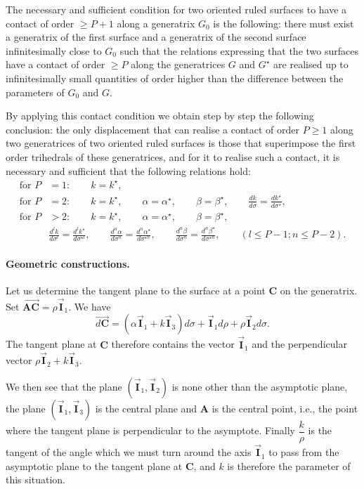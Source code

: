 \documentclass[leqno,11pt]{book}
\numberwithin{equation}{chapter}
\theoremstyle{shape1}
\theoremstyle{shapesmall}
\newcommand{\str}{^{\star}}
\newcommand{\rvec}[1]{\vec{\mathbf{#1}}}
\newcommand{\ivec}{\rvec{I}}
\begin{document}
The necessary and sufficient condition for two oriented ruled surfaces to have a contact of order $\ge P+1$ along a generatrix $G_{0}$ is the following: there must exist a generatrix of the first surface and a generatrix of the second surface infinitesimally close to $G_{0}$ such that the relations expressing that the two surfaces have a contact of order $\ge P$ along the generatrices $G$ and $G\str$ are realised up to infinitesimally small quantities of order higher than the difference between the parameters of $G_{0}$ and $G$.

By applying this contact condition we obtain step by step the following conclusion: the only displacement that can realise a contact of order $P\ge 1$ along two generatrices of two oriented ruled surfaces is those that superimpose the first order trihedrals of these generatrices, and for it to realise such a contact, it is necessary and sufficient that the following relations hold:
\begin{align*}
  \text{for }P&=1:\qquad k=k\str,\\
  \text{for }P&=2:\qquad k=k\str,\qquad\alpha=\alpha\str,\qquad\beta=\beta\str,\qquad\frac{dk}{d\sigma}=\frac{dk\str}{d\sigma\str},\\
  \text{for }P&>2:\qquad k=k\str,\qquad\alpha=\alpha\str,\qquad\beta=\beta\str,\\
&\frac{d^{l}k}{d\sigma^{l}}=\frac{d^{l}k\str}{d\sigma^{\star l}},\qquad
\frac{d^{n}\alpha}{d\sigma^{n}}=\frac{d^{n}\alpha\str}{d\sigma^{\star n}},\qquad
\frac{d^{n}\beta}{d\sigma^{n}}=\frac{d^{n}\beta\str}{d\sigma^{\star n}},\qquad
(l\le P-1;n\le P-2).
\end{align*}


\paragraph{Geometric constructions.}
\label{sec:48}
Let us determine the tangent plane to the surface at a point $\mathbf{C}$ on the generatrix. Set $\overrightarrow{\mathbf{AC}}=\rho\ivec_{1}$. We have
\[
\overrightarrow{d\mathbf{C}}=(\alpha\ivec_{1}+k\ivec_{3})d\sigma+\ivec_{1}d\rho+\rho\ivec_{2}d\sigma.
\]
The tangent plane at $\mathbf{C}$ therefore contains the vector $\ivec_{1}$ and the perpendicular vector $\rho\ivec_{2}+k\ivec_{3}$.

We then see that the plane $(\ivec_{1},\ivec_{2})$ is none other than the asymptotic plane, the plane $(\ivec_{1},\ivec_{3})$ is the central plane and $\mathbf{A}$ is the central point, i.e., the point where the tangent plane is perpendicular to the asymptote. Finally $\dfrac{k}{\rho}$ is the tangent of the angle which we must turn around the axis $\ivec_{1}$ to pass from the asymptotic plane to the tangent plane at $\mathbf{C}$, and $k$ is therefore the parameter of this situation.
\end{document}
